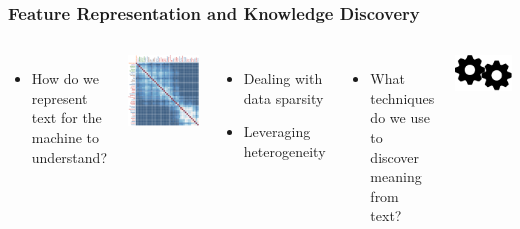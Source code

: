 \documentclass[10pt,=table]{beamer}
\begin{document}
	
\begin{frame}
\frametitle{Feature Representation and Knowledge Discovery}


\begin{columns}
	\begin{itemize}
		\item[] How do we represent text for the machine to understand? 
	\end{itemize}
	\begin{minipage}[c][0.5\textheight][c]{\linewidth}
		\centering
		\includegraphics[width=.7\linewidth]{image2/Chapitre1/matrix.png}
	\end{minipage}
	\begin{itemize}
		\item[] Dealing with \textcolor{orangeEric}{data sparsity}
		\item[] Leveraging \textcolor{orangeEric}{heterogeneity}
	\end{itemize}	
	\begin{itemize}
		\item[] What techniques do we use to discover meaning from text?
	\end{itemize}
	
	\begin{minipage}[c][0.5\textheight][c]{\linewidth}
		\centering
		\includegraphics[width=.8\linewidth]{image2/Chapitre1/kdisc.png}


\end{minipage}
\end{columns}
\end{frame}
\end{document}
